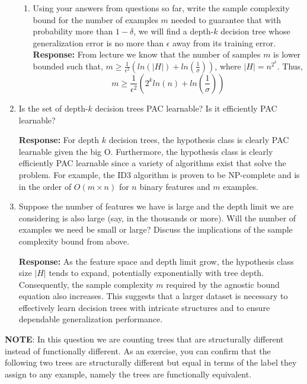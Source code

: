 \begin{enumerate}
\begin{enumerate}
  \item \relax[4 points] Using your answers from questions so far, write the
    sample complexity bound for the number of examples $m$ needed to guarantee
    that with probability more than $1- \delta$, we will find a depth-$k$
    decision tree whose generalization error is no more than $\epsilon$ away
    from its training error.\newline
	\textbf{Response:} From lecture we know that the number of samples $m$ is lower bounded such that, $m \geq \frac{1}{\epsilon ^2}(ln(|H|)+ln(\frac{1}{\sigma}))$, where $|H| = n^{2^k}$. Thus, $$m \geq \frac{1}{\epsilon ^2}(2^k ln(n)+ln(\frac{1}{\sigma}))$$
  \end{enumerate}

\item \relax[4 points] Is the set of depth-$k$ decision trees PAC learnable? Is
  it efficiently PAC learnable? \newline
  
  \textbf{Response:} For depth $k$ decision trees, the hypothesis class is clearly PAC learnable given the big O. Furthermore, the hypothesis class is clearly efficiently PAC learnable since a variety of algorithms exist that solve the problem. For example, the ID3 algorithm is proven to be NP-complete and is in the order of $O(m \times n)$ for $n$ binary features and $m$ examples.

\item \relax[4 points] Suppose the number of features we have is large and the
  depth limit we are considering is also large (say, in the thousands or
  more). Will the number of examples we need be small or large? Discuss the
  implications of the sample complexity bound from above.
  
  \textbf{Response:} As the feature space and depth limit grow, the hypothesis class size $|H|$ tends to expand, potentially exponentially with tree depth. Consequently, the sample complexity $m$ required by the agnostic bound equation also increases. This suggests that a larger dataset is necessary to effectively learn decision trees with intricate structures and to ensure dependable generalization performance.
  
\end{enumerate}

\textbf{NOTE}: In this question we are counting trees that are structurally different instead of functionally different. As an exercise, you can confirm that the following two trees are structurally different but equal in terms of the label they assign to any example, namely the trees are functionally equivalent.


